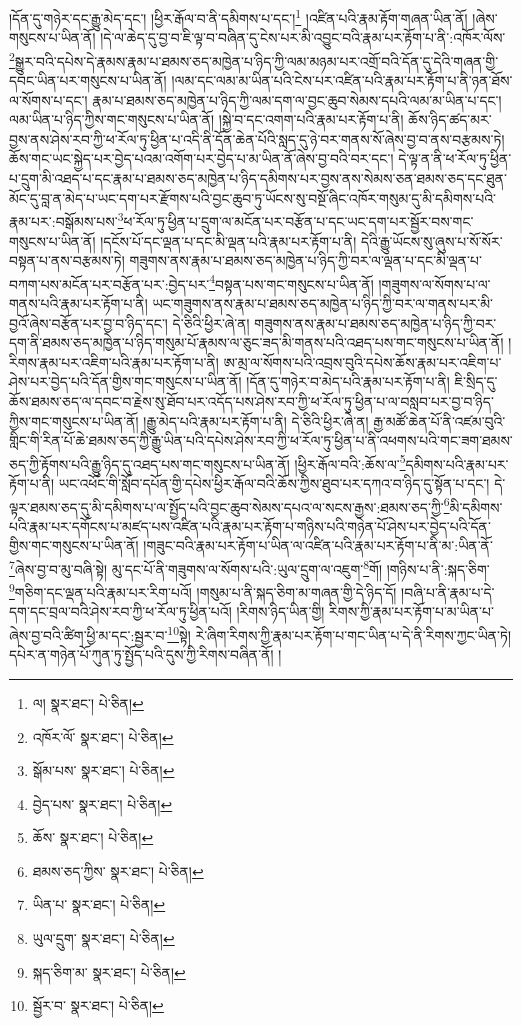 །དོན་དུ་གཉེར་དང་རྒྱུ་མེད་དང་། །ཕྱིར་རྒོལ་བ་ནི་དམིགས་པ་དང་།\footnote{ལ།  སྣར་ཐང་།  པེ་ཅིན། } །འཛིན་པའི་རྣམ་རྟོག་གཞན་ཡིན་ནོ། །ཞེས་གསུངས་པ་ཡིན་ནོ། །དེ་ལ་ཆེད་དུ་བྱ་བ་ཇི་ལྟ་བ་བཞིན་དུ་ངེས་པར་མི་འབྱུང་བའི་རྣམ་པར་རྟོག་པ་ནི་:འཁོར་ལོས་\footnote{འཁོར་ལོ་  སྣར་ཐང་།  པེ་ཅིན། }སྒྱུར་བའི་དཔེས་དེ་རྣམས་རྣམ་པ་ཐམས་ཅད་མཁྱེན་པ་ཉིད་ཀྱི་ལམ་མཉམ་པར་འགྲོ་བའི་དོན་དུ་དེའི་གཞན་གྱི་དབང་ཡིན་པར་གསུངས་པ་ཡིན་ནོ། །ལམ་དང་ལམ་མ་ཡིན་པའི་ངེས་པར་འཛིན་པའི་རྣམ་པར་རྟོག་པ་ནི་ཉན་ཐོས་ལ་སོགས་པ་དང་། རྣམ་པ་ཐམས་ཅད་མཁྱེན་པ་ཉིད་ཀྱི་ལམ་དག་ལ་བྱང་ཆུབ་སེམས་དཔའི་ལམ་མ་ཡིན་པ་དང་། ལམ་ཡིན་པ་ཉིད་ཀྱིས་གང་གསུངས་པ་ཡིན་ནོ། །སྐྱེ་བ་དང་འགག་པའི་རྣམ་པར་རྟོག་པ་ནི། ཆོས་ཉིད་ཚད་མར་བྱས་ནས་ཤེས་རབ་ཀྱི་ཕ་རོལ་ཏུ་ཕྱིན་པ་འདི་ནི་དོན་ཆེན་པོའི་སླད་དུ་ཉེ་བར་གནས་སོ་ཞེས་བྱ་བ་ནས་བརྩམས་ཏེ། ཆོས་གང་ཡང་སྐྱེད་པར་བྱེད་པའམ་འགོག་པར་བྱེད་པ་མ་ཡིན་ནོ་ཞེས་བྱ་བའི་བར་དང་། དེ་ལྟ་ན་ནི་ཕ་རོལ་ཏུ་ཕྱིན་པ་དྲུག་མི་འཐད་པ་དང་རྣམ་པ་ཐམས་ཅད་མཁྱེན་པ་ཉིད་དམིགས་པར་བྱས་ནས་སེམས་ཅན་ཐམས་ཅད་དང་ཐུན་མོང་དུ་བླ་ན་མེད་པ་ཡང་དག་པར་རྫོགས་པའི་བྱང་ཆུབ་ཏུ་ཡོངས་སུ་བསྔོ་ཞིང་འཁོར་གསུམ་དུ་མི་དམིགས་པའི་རྣམ་པར་:བསྒོམས་པས་\footnote{སྒོམ་པས་  སྣར་ཐང་།  པེ་ཅིན། }ཕ་རོལ་ཏུ་ཕྱིན་པ་དྲུག་ལ་མངོན་པར་བརྩོན་པ་དང་ཡང་དག་པར་སྦྱོར་བས་གང་གསུངས་པ་ཡིན་ནོ། །དངོས་པོ་དང་ལྡན་པ་དང་མི་ལྡན་པའི་རྣམ་པར་རྟོག་པ་ནི། དེའི་རྒྱུ་ཡོངས་སུ་ཞུས་པ་སོ་སོར་བསྟན་པ་ནས་བརྩམས་ཏེ། གཟུགས་ནས་རྣམ་པ་ཐམས་ཅད་མཁྱེན་པ་ཉིད་ཀྱི་བར་ལ་ལྡན་པ་དང་མི་ལྡན་པ་བཀག་པས་མངོན་པར་བརྩོན་པར་:བྱེད་པར་\footnote{བྱེད་པས་  སྣར་ཐང་།  པེ་ཅིན། }བསྟན་པས་གང་གསུངས་པ་ཡིན་ནོ། །གཟུགས་ལ་སོགས་པ་ལ་གནས་པའི་རྣམ་པར་རྟོག་པ་ནི། ཡང་གཟུགས་ནས་རྣམ་པ་ཐམས་ཅད་མཁྱེན་པ་ཉིད་ཀྱི་བར་ལ་གནས་པར་མི་བྱའོ་ཞེས་བརྩོན་པར་བྱ་བ་ཉིད་དང་། དེ་ཅིའི་ཕྱིར་ཞེ་ན། གཟུགས་ནས་རྣམ་པ་ཐམས་ཅད་མཁྱེན་པ་ཉིད་ཀྱི་བར་དག་ནི་ཐམས་ཅད་མཁྱེན་པ་ཉིད་གསུམ་པོ་རྣམས་ལ་ཅུང་ཟད་མི་གནས་པའི་འཐད་པས་གང་གསུངས་པ་ཡིན་ནོ། །རིགས་རྣམ་པར་འཇིག་པའི་རྣམ་པར་རྟོག་པ་ནི། ཨ་མྲ་ལ་སོགས་པའི་འབྲས་བུའི་དཔེས་ཆོས་རྣམ་པར་འཇིག་པ་ཤེས་པར་བྱེད་པའི་དོན་གྱིས་གང་གསུངས་པ་ཡིན་ནོ། །དོན་དུ་གཉེར་བ་མེད་པའི་རྣམ་པར་རྟོག་པ་ནི། ཇི་སྲིད་དུ་ཆོས་ཐམས་ཅད་ལ་དབང་བ་རྗེས་སུ་ཐོབ་པར་འདོད་པས་ཤེས་རབ་ཀྱི་ཕ་རོལ་ཏུ་ཕྱིན་པ་ལ་བསླབ་པར་བྱ་བ་ཉིད་ཀྱིས་གང་གསུངས་པ་ཡིན་ནོ། །རྒྱུ་མེད་པའི་རྣམ་པར་རྟོག་པ་ནི། དེ་ཅིའི་ཕྱིར་ཞེ་ན། རྒྱ་མཚོ་ཆེན་པོ་ནི་འཛམ་བུའི་གླིང་གི་རིན་པོ་ཆེ་ཐམས་ཅད་ཀྱི་རྒྱུ་ཡིན་པའི་དཔེས་ཤེས་རབ་ཀྱི་ཕ་རོལ་ཏུ་ཕྱིན་པ་ནི་འཕགས་པའི་གང་ཟག་ཐམས་ཅད་ཀྱི་རྟོགས་པའི་རྒྱུ་ཉིད་དུ་འཐད་པས་གང་གསུངས་པ་ཡིན་ནོ། །ཕྱིར་རྒོལ་བའི་:ཆོས་ལ་\footnote{ཆོས་  སྣར་ཐང་།  པེ་ཅིན། }དམིགས་པའི་རྣམ་པར་རྟོག་པ་ནི། ཡང་འཕོང་གི་སློབ་དཔོན་གྱི་དཔེས་ཕྱིར་རྒོལ་བའི་ཆོས་ཀྱིས་ཐུབ་པར་དཀའ་བ་ཉིད་དུ་སྟོན་པ་དང་། དེ་ལྟར་ཐམས་ཅད་དུ་མི་དམིགས་པ་ལ་སྤྱོད་པའི་བྱང་ཆུབ་སེམས་དཔའ་ལ་སངས་རྒྱས་:ཐམས་ཅད་ཀྱི་\footnote{ཐམས་ཅད་ཀྱིས་  སྣར་ཐང་།  པེ་ཅིན། }མི་དམིགས་པའི་རྣམ་པར་དགོངས་པ་མཛད་པས་འཛིན་པའི་རྣམ་པར་རྟོག་པ་གཉིས་པའི་གཉེན་པོ་ཤེས་པར་བྱེད་པའི་དོན་གྱིས་གང་གསུངས་པ་ཡིན་ནོ། །གཟུང་བའི་རྣམ་པར་རྟོག་པ་ཡིན་ལ་འཛིན་པའི་རྣམ་པར་རྟོག་པ་ནི་མ་:ཡིན་ནོ་\footnote{ཡིན་པ་  སྣར་ཐང་།  པེ་ཅིན། }ཞེས་བྱ་བ་མུ་བཞི་སྟེ། མུ་དང་པོ་ནི་གཟུགས་ལ་སོགས་པའི་:ཡུལ་དྲུག་ལ་འཇུག་\footnote{ཡུལ་དྲུག་  སྣར་ཐང་།  པེ་ཅིན། }གོ། །གཉིས་པ་ནི་:སྐད་ཅིག་\footnote{སྐད་ཅིག་མ་  སྣར་ཐང་།  པེ་ཅིན། }གཅིག་དང་ལྡན་པའི་རྣམ་པར་རིག་པའོ། །གསུམ་པ་ནི་སྐད་ཅིག་མ་གཞན་གྱི་དེ་ཉིད་དོ། །བཞི་པ་ནི་རྣམ་པ་དེ་དག་དང་བྲལ་བའི་ཤེས་རབ་ཀྱི་ཕ་རོལ་ཏུ་ཕྱིན་པའོ། །རིགས་ཉིད་ཡིན་གྱི། རིགས་ཀྱི་རྣམ་པར་རྟོག་པ་མ་ཡིན་པ་ཞེས་བྱ་བའི་ཚིག་ཕྱི་མ་དང་:སྦྱར་བ་\footnote{སྦྱོར་བ་  སྣར་ཐང་།  པེ་ཅིན། }སྟེ། རེ་ཞིག་རིགས་ཀྱི་རྣམ་པར་རྟོག་པ་གང་ཡིན་པ་དེ་ནི་རིགས་ཀྱང་ཡིན་ཏེ། དཔེར་ན་གཉེན་པོ་ཀུན་ཏུ་སྤྱོད་པའི་དུས་ཀྱི་རིགས་བཞིན་ནོ། །
